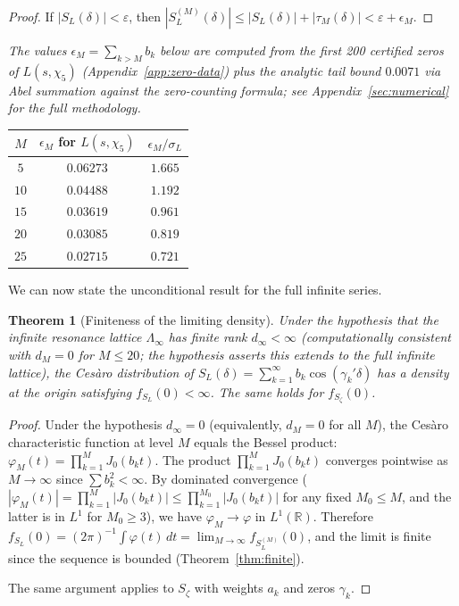 \documentclass[12pt,reqno]{amsart}
\theoremstyle{plain}
\newtheorem{theorem}{Theorem}[section]
\theoremstyle{definition}
\theoremstyle{remark}
\newcommand{\R}{\mathbb{R}}
\begin{document}
\begin{proof}
If $|S_L(\delta)| < \varepsilon$, then $|S_L^{(M)}(\delta)| \leq |S_L(\delta)| + |\tau_M(\delta)| < \varepsilon + \epsilon_M$.
\end{proof}

\begin{center}
\renewcommand{\arraystretch}{1.1}
\noindent\textit{The values $\epsilon_M = \sum_{k > M} b_k$ below are computed from the first 200 certified zeros of $L(s,\chi_5)$ (Appendix~\ref{app:zero-data}) plus the analytic tail bound $0.0071$ via Abel summation against the zero-counting formula; see Appendix~\ref{sec:numerical} for the full methodology.}

\medskip
\begin{tabular}{ccc}
\toprule
$M$ & $\epsilon_M$ for $L(s,\chi_5)$ & $\epsilon_M/\sigma_L$ \\
\midrule
$5$ & $0.06273$ & $1.665$ \\
$10$ & $0.04488$ & $1.192$ \\
$15$ & $0.03619$ & $0.961$ \\
$20$ & $0.03085$ & $0.819$ \\
$25$ & $0.02715$ & $0.721$ \\
\bottomrule
\end{tabular}
\end{center}

We can now state the unconditional result for the full infinite series.

\begin{theorem}[Finiteness of the limiting density]\label{thm:telescoping}
Under the hypothesis that the infinite resonance lattice $\Lambda_\infty$ has finite rank $d_\infty < \infty$ (computationally consistent with $d_M = 0$ for $M \leq 20$; the hypothesis asserts this extends to the full infinite lattice), the Ces\`aro distribution of $S_L(\delta) = \sum_{k=1}^\infty b_k\cos(\gamma_k'\delta)$ has a density at the origin satisfying $f_{S_L}(0) < \infty$.  The same holds for $f_{S_\zeta}(0)$.
\end{theorem}

\begin{proof}
Under the hypothesis $d_\infty = 0$ (equivalently, $d_M = 0$ for all $M$), the Ces\`aro characteristic function at level $M$ equals the Bessel product: $\varphi_M(t) = \prod_{k=1}^M J_0(b_k t)$.  The product $\prod_{k=1}^M J_0(b_k t)$ converges pointwise as $M \to \infty$ since $\sum b_k^2 < \infty$.  By dominated convergence ($|\varphi_M(t)| = \prod_{k=1}^M |J_0(b_k t)| \leq \prod_{k=1}^{M_0} |J_0(b_k t)|$ for any fixed $M_0 \leq M$, and the latter is in $L^1$ for $M_0 \geq 3$), we have $\varphi_M \to \varphi$ in $L^1(\R)$.  Therefore $f_{S_L}(0) = (2\pi)^{-1}\int \varphi(t)\, dt = \lim_{M\to\infty} f_{S_L^{(M)}}(0)$, and the limit is finite since the sequence is bounded (Theorem~\ref{thm:finite}).

The same argument applies to $S_\zeta$ with weights $a_k$ and zeros $\gamma_k$.
\end{proof}
\end{document}
